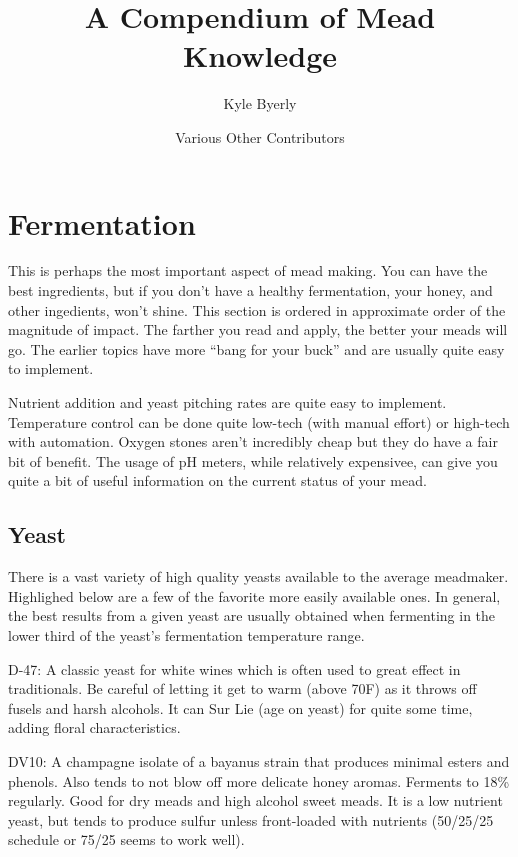 \documentclass{article}
\title{A Compendium of Mead Knowledge}
\author{
  Kyle Byerly\\
 \and
  Various Other Contributors\\
}
\begin{document}
\maketitle
\newpage

\tableofcontents
\newpage

\section{Fermentation}
 This is perhaps the most important aspect of mead making. You can have the best ingredients, but if you don't have a healthy fermentation, your honey, and other ingedients,
 won't shine. This section is ordered in approximate order of the magnitude of impact. The farther you read and apply, the better your meads will go. The earlier topics have
 more ``bang for your buck'' and are  usually quite easy to implement. 

 Nutrient addition and yeast pitching rates are quite easy to implement. Temperature control can be done quite low-tech (with manual effort) or high-tech with automation. 
 Oxygen stones aren't incredibly cheap but they do have a fair bit of benefit. The usage of pH meters, while relatively expensivee, can give you quite a bit of useful
 information on the current status of your mead.
 \subsection{Yeast}
  There is a vast variety of high quality yeasts available to the average meadmaker. Highlighed below are a few of the favorite more easily available ones.
  In general, the best results from a given yeast are usually obtained when fermenting in the lower third of the yeast's fermentation temperature range.

  D-47: A classic yeast for white wines which is often used to great effect in traditionals. Be careful of letting it get to warm (above 70\textdegree F) as it throws off fusels and harsh alcohols. It can Sur Lie (age on yeast) for quite some time, adding floral characteristics.

  DV10: A champagne isolate of a bayanus strain that produces minimal esters and phenols. Also tends to not blow off more delicate honey aromas. 
  Ferments to 18\% regularly. Good for dry meads and high alcohol sweet meads. It is a low nutrient yeast, but tends to produce sulfur unless 
  front-loaded with nutrients (50/25/25 schedule or 75/25 seems to work well).
\end{document}
